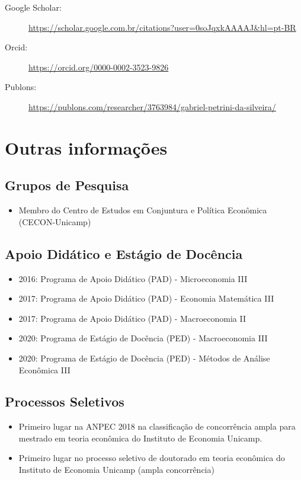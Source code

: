 \documentclass[11pt,a4paper]{article} \usepackage[utf8]{inputenc}
\begin{document}
\begin{description}
  \item[Google Scholar:] \url{https://scholar.google.com.br/citations?user=0soJqxkAAAAJ&hl=pt-BR}
  \item[Orcid:] \url{https://orcid.org/0000-0002-3523-9826}
  \item[Publons:] \url{https://publons.com/researcher/3763984/gabriel-petrini-da-silveira/}
\end{description}

\section{Outras informações}
\subsection{Grupos de Pesquisa}
\begin{itemize}
 \item Membro do Centro de Estudos em Conjuntura e Política Econômica (CECON-Unicamp)
\end{itemize}


\subsection{Apoio Didático e Estágio de Docência}
\begin{itemize}
  \item 2016: Programa de Apoio Didático (PAD) - Microeconomia III
  \item 2017: Programa de Apoio Didático (PAD) - Economia Matemática III
  \item 2017: Programa de Apoio Didático (PAD) - Macroeconomia II
  \item 2020: Programa de Estágio de Docência (PED) - Macroeconomia III
  \item 2020: Programa de Estágio de Docência (PED) - Métodos de Análise
		Econômica III
\end{itemize}

\subsection{Processos Seletivos}
\begin{itemize}
  \item Primeiro lugar na ANPEC 2018 na classificação de concorrência ampla para
		mestrado em teoria econômica do Instituto de Economia Unicamp.
  \item Primeiro lugar no processo seletivo de doutorado em teoria econômica do
		Instituto de Economia Unicamp (ampla concorrência)
\end{itemize}
\end{document}
